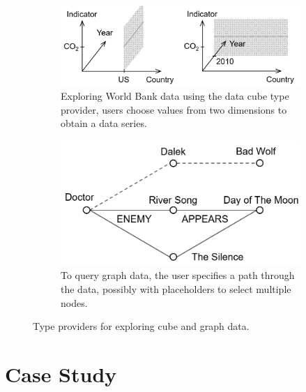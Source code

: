 \documentclass[conference]{IEEEtran}
\begin{document}
\begin{figure}[h]
\centering
\begin{subfigure}[b]{0.5\textwidth}
  \centering
  \includegraphics[scale=0.27]{figures/cubetp}
  \vspace{0.5em}
  \caption{Exploring World Bank data using the data cube type provider, users
    choose values from two dimensions to obtain a data series.}
  \label{fig:cubetp}
  \vspace{1em}
\end{subfigure}
\begin{subfigure}[b]{0.45\textwidth}
  \centering
  \includegraphics[scale=0.31]{figures/graphtp}
  \caption{To query graph data, the user specifies a path through the data, possibly with
    placeholders to select multiple nodes.}
  \label{fig:graphtp}
  \vspace{0.5em}
\end{subfigure}
\caption{Type providers for exploring cube and graph data.}
\label{fig:tps}
\vspace{-0.5em}
\end{figure}



\section{Case Study}
\label{sec:cases}
\end{document}
